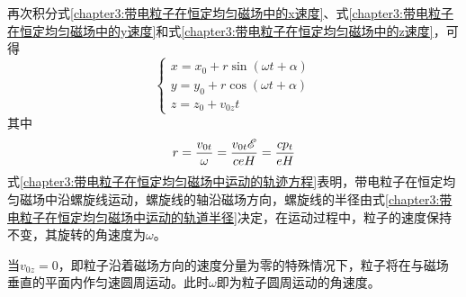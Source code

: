 再次积分式\eqref{chapter3:带电粒子在恒定均匀磁场中的x速度}、式\eqref{chapter3:带电粒子在恒定均匀磁场中的y速度}和式\eqref{chapter3:带电粒子在恒定均匀磁场中的z速度}，可得
\begin{equation}
\begin{cases}
	x = x_0 + r \sin(\omega t+\alpha) \\
	y = y_0 + r \cos(\omega t+\alpha) \\
	z = z_0 + v_{0z}t
\end{cases}
\label{chapter3:带电粒子在恒定均匀磁场中运动的轨迹方程}
\end{equation}
其中
\begin{equation}
	r = \dfrac{v_{0t}}{\omega} = \dfrac{v_{0t}\mathscr{E}}{ceH} = \frac{cp_t}{eH}
	\label{chapter3:带电粒子在恒定均匀磁场中运动的轨道半径}
\end{equation}
式\eqref{chapter3:带电粒子在恒定均匀磁场中运动的轨迹方程}表明，带电粒子在恒定均匀磁场中沿螺旋线运动，螺旋线的轴沿磁场方向，螺旋线的半径由式\eqref{chapter3:带电粒子在恒定均匀磁场中运动的轨道半径}决定，在运动过程中，粒子的速度保持不变，其旋转的角速度为$\omega$。

当$v_{0z}=0$，即粒子沿着磁场方向的速度分量为零的特殊情况下，粒子将在与磁场垂直的平面内作匀速圆周运动。此时$\omega$即为粒子圆周运动的角速度。

